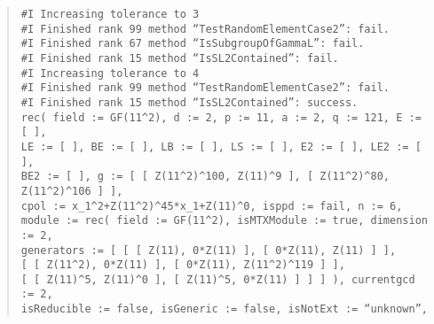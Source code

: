 \documentclass[a4paper,11pt]{article}
\theoremstyle{bla}
\begin{document}
\begin{quote}
\hspace*{-1cm} \texttt{\#I  Increasing tolerance to 3}\\
\hspace*{-1cm} \texttt{\#I  Finished rank 99 method ``TestRandomElementCase2'': fail.}\\
\hspace*{-1cm} \texttt{\#I  Finished rank 67 method ``IsSubgroupOfGammaL'': fail.}\\
\hspace*{-1cm} \texttt{\#I  Finished rank 15 method ``IsSL2Contained'': fail.}\\
\hspace*{-1cm} \texttt{\#I  Increasing tolerance to 4}\\
\hspace*{-1cm} \texttt{\#I  Finished rank 99 method ``TestRandomElementCase2'': fail.}\\
\hspace*{-1cm} \texttt{\#I  Finished rank 15 method ``IsSL2Contained'': success.}\\
\hspace*{-1cm} \texttt{rec( field := GF(11\^{}2), d := 2, p := 11, a := 2, q := 121, E := [  ],}\\
  \hspace*{-1cm} \texttt{LE := [  ], BE := [  ], LB := [  ], LS := [  ], E2 := [  ], LE2 := [  ],}\\
  \hspace*{-1cm} \texttt{BE2 := [  ], g := [ [ Z(11\^{}2)\^{}100, Z(11)\^{}9 ], [ Z(11\^{}2)\^{}80, Z(11\^{}2)\^{}106 ] ],}\\
  \hspace*{-1cm} \texttt{cpol := x\_1\^{}2+Z(11\^{}2)\^{}45*x\_1+Z(11)\^{}0, isppd := fail, n := 6,}\\
  \hspace*{-1cm} \texttt{module := rec( field := GF(11\^{}2), isMTXModule := true, dimension := 2,}\\
      \hspace*{-1cm} \texttt{generators := [ [ [ Z(11), 0*Z(11) ], [ 0*Z(11), Z(11) ] ],}\\
          \hspace*{-1cm} \texttt{[ [ Z(11\^{}2), 0*Z(11) ], [ 0*Z(11), Z(11\^{}2)\^{}119 ] ],}\\
          \hspace*{-1cm} \texttt{[ [ Z(11)\^{}5, Z(11)\^{}0 ], [ Z(11)\^{}5, 0*Z(11) ] ] ] ), currentgcd := 2,}\\
  \hspace*{-1cm} \texttt{isReducible := false, isGeneric := false, isNotExt := ``unknown'',}\\

\end{quote}
\end{document}
